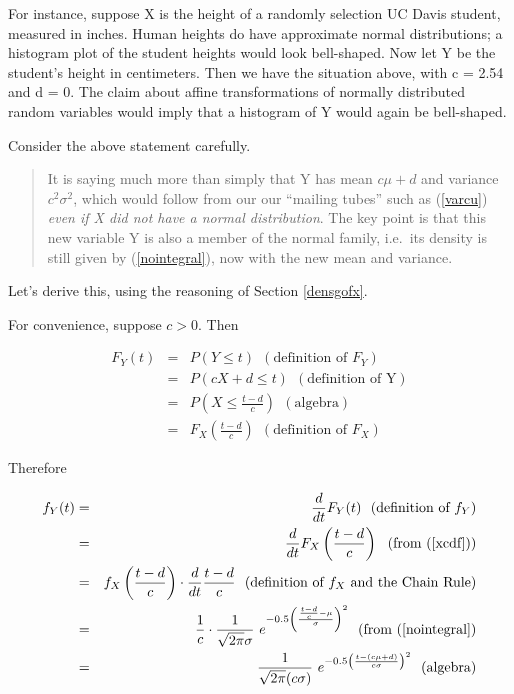 For instance, suppose X is the height of a randomly selection UC Davis
student, measured in inches.  Human heights do have approximate normal
distributions; a histogram plot of the student heights would look
bell-shaped.  Now let Y be the student's height in centimeters.  Then we
have the situation above, with c = 2.54 and d = 0.  The claim about
affine transformations of normally distributed random variables would
imply that a histogram of Y would again be bell-shaped.

Consider the above statement carefully.  

\begin{quote}

It is saying much more than simply that Y has mean $c\mu + d$ and
variance $c^2\sigma^2$, which would follow from our our ``mailing
tubes'' such as (\ref{varcu}) {\it even if X did not have a normal
distribution}.  The key point is that this new variable Y is also a
member of the normal family, i.e.\ its density is still given by
(\ref{nointegral}), now with the new mean and variance.

\end{quote}

Let's derive this, using the reasoning of Section \ref{densgofx}.

For convenience, suppose $c > 0$.  Then

\begin{eqnarray}
F_Y(t) &=& P(Y \leq t)  ~~ (\textrm{definition of } F_Y)  \\ 
&=& P(cX + d \leq t) ~~ (\textrm{definition of Y}) \\
&=& P \left ( X \leq \frac{t-d}{c} \right ) ~~ (\textrm{algebra}) \\
&=& F_X \left (\frac{t-d}{c} \right )~~ (\textrm{definition of } F_X)
\label{xcdf}
\end{eqnarray}

Therefore

\begin{eqnarray}
f_Y(t) &=& \frac{d}{dt} F_Y(t) ~~ (\textrm{definition of } f_Y) \\
&=& \frac{d}{dt} F_X \left (\frac{t-d}{c} \right ) ~~ (\textrm{from } 
(\ref{xcdf})) \\      
&=& f_X \left ( \frac{t-d}{c} \right ) \cdot \frac{d}{dt} \frac{t-d}{c}
~~ (\textrm{definition of } f_X \textrm{ and the Chain Rule}) \\
&=& \frac{1}{c} \cdot 
\frac{1}{\sqrt{2\pi} \sigma} ~ e^{- 0.5 
\left (\frac{\frac{t-d}{c}-\mu}{\sigma} \right )^2} 
~~ (\textrm{from } (\ref{nointegral}) \\
&=& \frac{1}{\sqrt{2\pi} (c \sigma)} ~ 
e^{- 0.5 \left (\frac{t-(c\mu +d)}{c\sigma} \right )^2} ~~ (\textrm{algebra})
\end{eqnarray}

